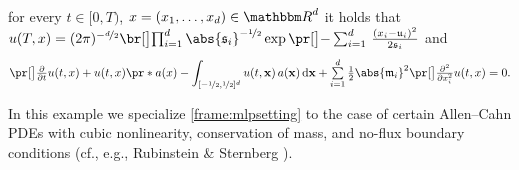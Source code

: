 \begin{example}
			for every
				$t\in [0,T)$,
				$x = (x_1,\dots,x_d) \in \R^d$
			it holds that
				$u(T,x)= (2\pi)^{-\nicefrac{d}{2}}\bbr{ \prod_{ i = 1 }^d \abs{\mathfrak{s}_i}^{-\nicefrac{1}{2}}} \exp \bpr{-\sum_{i = 1}^d \, \frac{(x_i - \mathfrak{u}_i )^2}{2\mathfrak{s}_i}}$ and
			\begin{equation}
				\label{eqMLP:aniso_mutator_selector}
				\bpr{\tfrac{\partial }{\partial t}u} (t,x) 
				+
				u(t,x)\pr*{a(x) - \int_{[-\nicefrac12,\nicefrac12]^d} u(t,\mathbf{x})\, a(\mathbf{x}) \, \diff\mathbf{x} } 
				+ \smallsuml_{i=1}^{d} \tfrac{1}{2} \abs{\mathfrak{m}_i}^2 \bpr{\tfrac{\partial^2 }{\partial x_i^2} u} (t,x) 
				=
				0
				.
		\end{equation}
\end{example}


\begin{example}
	\label{exampleMLP:allen_cahn}
	In this example we specialize \cref{frame:mlpsetting} to the case of certain Allen--Cahn PDEs with cubic nonlinearity, conservation of mass, and no-flux boundary conditions (cf., e.g., Rubinstein \& Sternberg \citep{RUBINSTEIN1992}).
	

\end{example}
